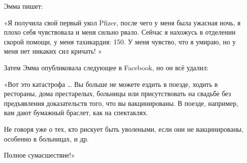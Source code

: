 Эмма пишет:

«Я получила свой первый укол Pfizer, после чего у меня была ужасная ночь, я
плохо себя чувствовала и меня сильно рвало. Сейчас я нахожусь в отделении скорой
помощи, у меня тахикардия: 150. У меня чувство, что я умираю, но у меня нет
никаких сил кричать! »

Затем Эмма опубликовала следующее в Facebook, но он всё удалил:

«Вот это катастрофа … Вы больше не можете ездить в поезде, ходить в рестораны,
дома престарелых, больницы или присутствовать на свадьбе без предъявления
доказательств того, что вы вакцинированы. В поезде, например, вам дают бумажный
браслет, как на спектаклях.

Не говоря уже о тех, кто рискует быть уволеными, если они не вакцинированы,
особенно в больницах, и др.

Полное сумасшествие!»
